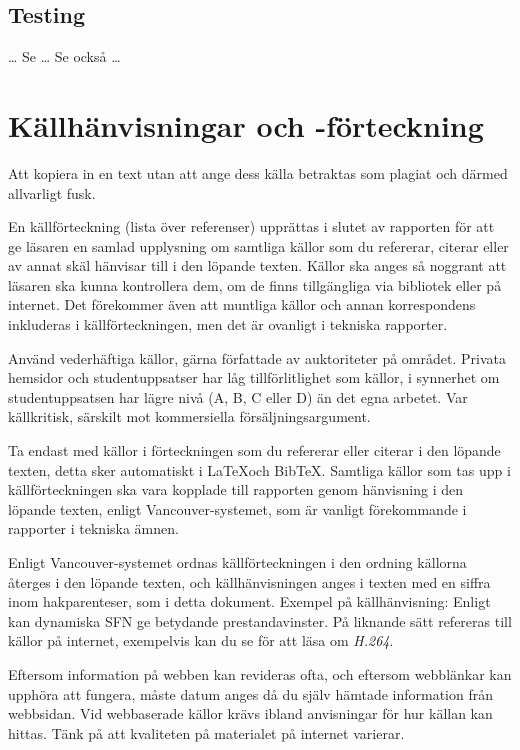 \subsection{Testing}
\noindent
\dots
Se  \dots
Se också  \dots


\section{Källhänvisningar och -förteckning}
\label{sec:references}
\noindent
Att kopiera in en text utan att ange dess källa betraktas som plagiat och 
därmed allvarligt fusk.

En källförteckning (lista över referenser) upprättas i slutet av rapporten för 
att ge läsaren en samlad upplysning om samtliga källor som du refererar, 
citerar eller av annat skäl hänvisar till i den löpande texten.
Källor ska anges så noggrant att läsaren ska kunna kontrollera dem, om de finns 
tillgängliga via bibliotek eller på internet.
Det förekommer även att muntliga källor och annan korrespondens inkluderas 
i källförteckningen, men det är ovanligt i tekniska rapporter.

Använd vederhäftiga källor, gärna författade av auktoriteter på området.
Privata hemsidor och studentuppsatser har låg tillförlitlighet som källor, 
i synnerhet om studentuppsatsen har lägre nivå (A, B, C eller D) än det egna 
arbetet.
Var källkritisk, särskilt mot kommersiella försäljningsargument.

Ta endast med källor i förteckningen som du refererar eller citerar i den 
löpande texten, detta sker automatiskt i \LaTeX och Bib\TeX.
Samtliga källor som tas upp i källförteckningen ska vara kopplade till 
rapporten genom hänvisning i den löpande texten, enligt Vancouver-systemet, som 
är vanligt förekommande i rapporter i tekniska ämnen.

Enligt Vancouver-systemet ordnas källförteckningen i den ordning källorna 
återges i den löpande texten, och källhänvisningen anges i texten med en siffra 
inom hakparenteser, som i detta dokument.
Exempel på källhänvisning:
Enligt \citet{Eriksson2001dsf} kan dynamiska SFN ge betydande prestandavinster.
På liknande sätt refereras till källor på internet, exempelvis kan du se 
\citet{Wikipedia2010h264} för att läsa om \emph{H.264}.

Eftersom information på webben kan revideras ofta, och eftersom webblänkar kan 
upphöra att fungera, måste datum anges då du själv hämtade information från 
webbsidan.
Vid webbaserade källor krävs ibland anvisningar för hur källan kan hittas. Tänk 
på att kvaliteten på materialet på internet varierar.


